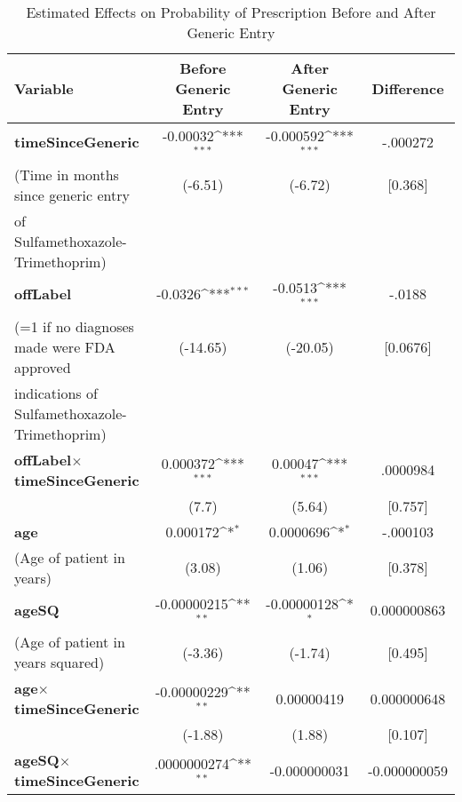 \begin{table}[htbp]\centering
\def\sym#1{\ifmmode^{#1}\else\(^{#1}\)\fi}
\caption{Estimated Effects on Probability of Prescription Before and After Generic Entry\label{tab1}}
\begin{tabular}{l*{3}{c}}
\hline\hline
Variable            &\multicolumn{1}{c}{Before Generic Entry}&\multicolumn{1}{c}{After Generic Entry}&\multicolumn{1}{c}{Difference}\\
\hline
\textbf{timeSinceGeneric}&                           -0.00032\sym{***}&   -0.000592\sym{***}&   -.000272\\
(Time in months since generic entry            &     (-6.51)         &     (-6.72)         &     [0.368]         \\
of Sulfamethoxazole-Trimethoprim)\\
[1em]
\textbf{offLabel}    &                                     -0.0326\sym{***}&     -0.0513\sym{***}&   -.0188\\
(=1 if no diagnoses made were FDA approved            &    (-14.65)         &    (-20.05)         &    [0.0676]         \\
indications of Sulfamethoxazole-Trimethoprim)\\
[1em]
\textbf{offLabel}$\times$\textbf{timeSinceGeneric} &    0.000372\sym{***}&    0.00047\sym{***}&   .0000984\\
            &                                           (7.7)         &      (5.64)         &    [0.757]         \\
[1em]
\textbf{age}         &                      0.000172\sym{*}  &    0.0000696\sym{*}  &   -.000103\\
(Age of patient in years)            &      (3.08)         &      (1.06)         &    [0.378]         \\
[1em]
\textbf{ageSQ}       &                             -0.00000215\sym{**} & -0.00000128\sym{*}  &   0.000000863\\
(Age of patient in years squared)            &     (-3.36)         &     (-1.74)         &    [0.495]         \\
[1em]
\textbf{age}$\times$\textbf{timeSinceGeneric}      & -0.00000229\sym{**} &  0.00000419         &   0.000000648\\
            &                                        (-1.88)         &      (1.88)         &    [0.107]         \\
[1em]
\textbf{ageSQ}$\times$\textbf{timeSinceGeneric}    &    .0000000274\sym{**} &   -0.000000031         &   -0.000000059\\

\end{tabular}
\end{table}
